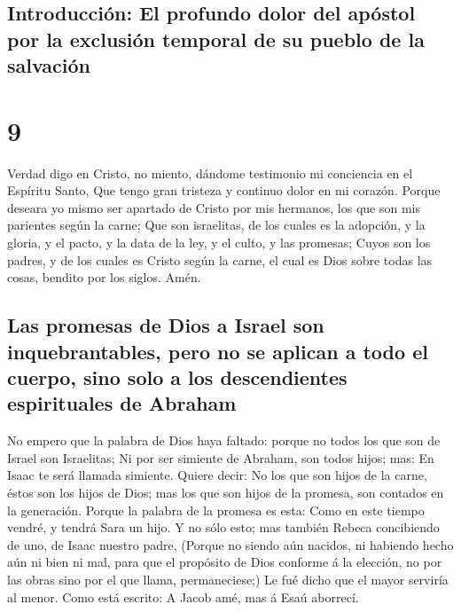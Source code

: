 \hypertarget{introducciuxf3n-el-profundo-dolor-del-apuxf3stol-por-la-exclusiuxf3n-temporal-de-su-pueblo-de-la-salvaciuxf3n}{%
\subsection{Introducción: El profundo dolor del apóstol por la exclusión
temporal de su pueblo de la
salvación}\label{introducciuxf3n-el-profundo-dolor-del-apuxf3stol-por-la-exclusiuxf3n-temporal-de-su-pueblo-de-la-salvaciuxf3n}}

\hypertarget{section-8}{%
\section{9}\label{section-8}}

 Verdad digo en Cristo, no miento, dándome testimonio mi
conciencia en el Espíritu Santo,  Que tengo gran tristeza y
continuo dolor en mi corazón.  Porque deseara yo mismo ser
apartado de Cristo por mis hermanos, los que son mis parientes según la
carne;  Que son israelitas, de los cuales es la adopción, y
la gloria, y el pacto, y la data de la ley, y el culto, y las promesas;
 Cuyos son los padres, y de los cuales es Cristo según la
carne, el cual es Dios sobre todas las cosas, bendito por los siglos.
Amén.

\hypertarget{las-promesas-de-dios-a-israel-son-inquebrantables-pero-no-se-aplican-a-todo-el-cuerpo-sino-solo-a-los-descendientes-espirituales-de-abraham}{%
\subsection{Las promesas de Dios a Israel son inquebrantables, pero no
se aplican a todo el cuerpo, sino solo a los descendientes espirituales
de
Abraham}\label{las-promesas-de-dios-a-israel-son-inquebrantables-pero-no-se-aplican-a-todo-el-cuerpo-sino-solo-a-los-descendientes-espirituales-de-abraham}}

 No empero que la palabra de Dios haya faltado: porque no
todos los que son de Israel son Israelitas;  Ni por ser
simiente de Abraham, son todos hijos; mas: En Isaac te será llamada
simiente.  Quiere decir: No los que son hijos de la carne,
éstos son los hijos de Dios; mas los que son hijos de la promesa, son
contados en la generación.  Porque la palabra de la promesa
es esta: Como en este tiempo vendré, y tendrá Sara un hijo.
 Y no sólo esto; mas también Rebeca concibiendo de uno, de
Isaac nuestro padre,  (Porque no siendo aún nacidos, ni
habiendo hecho aún ni bien ni mal, para que el propósito de Dios
conforme á la elección, no por las obras sino por el que llama,
permaneciese;)  Le fué dicho que el mayor serviría al
menor.  Como está escrito: A Jacob amé, mas á Esaú
aborrecí.

